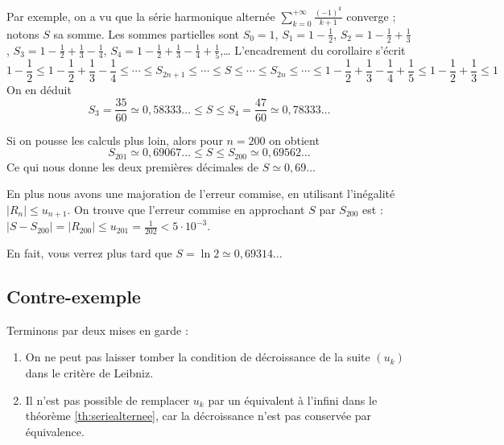 \documentclass[class=report,crop=false]{standalone}
\begin{document}
\begin{exemple}
Par exemple, on a vu que la série harmonique alternée 
$\sum_{k=0}^{+\infty} \frac{(-1)^{k}}{k+1}$ converge ;
notons $S$ sa somme.
Les sommes partielles sont
$S_0 = 1$, 
$S_1 = 1-\frac{1}{2}$,
$S_2 = 1-\frac{1}{2}+\frac{1}{3}$,
$S_3 = 1-\frac{1}{2}+\frac{1}{3}-\frac{1}{4}$,
$S_4 = 1-\frac{1}{2}+\frac{1}{3}-\frac{1}{4}+\frac{1}{5}$,\ldots
L'encadrement du corollaire s'écrit 
$$1-\frac{1}{2} \le 1-\frac{1}{2}+\frac{1}{3}-\frac{1}{4} \le \cdots \le S_{2n+1} \le \cdots \le S 
  \le  \cdots\le S_{2n} \le \cdots 
  \le 1-\frac{1}{2}+\frac{1}{3}-\frac{1}{4}+\frac{1}{5}
  \le 1-\frac{1}{2}+\frac{1}{3} \le 1$$
On en déduit 
$$S_3 = \frac{35}{60} \simeq 0,58333\ldots \le S \le S_4 = \frac{47}{60} \simeq 0,78333\ldots$$

  
Si on pousse les calculs plus loin, alors pour $n=200$
on obtient 
$$S_{201} \simeq 0,69067\ldots \le S \le S_{200} \simeq 0,69562\ldots$$
Ce qui nous donne les deux premières décimales de $S \simeq 0,69\ldots$

En plus nous avons une majoration de l'erreur commise, en utilisant l'inégalité $|R_n|\le u_{n+1}$.
On trouve que l'erreur commise en approchant $S$ par $S_{200}$ est :
$|S-S_{200}| = |R_{200}| \le u_{201} = \frac{1}{202} < 5 \cdot 10^{-3}$.

En fait, vous verrez plus tard que $S=\ln 2 \simeq 0,69314\ldots$
\end{exemple}




\subsection{Contre-exemple}

Terminons par deux mises en garde : 

\begin{enumerate}
  \item On ne peut pas laisser tomber la condition 
  de décroissance de la suite $(u_k)$ dans le critère
de Leibniz.

  \item Il n'est pas possible de remplacer
$u_k$ par un équivalent à l'infini dans le théorème
\ref{th:seriealternee}, car la décroissance n'est pas conservée par
équivalence.   
\end{enumerate}
\end{document}
